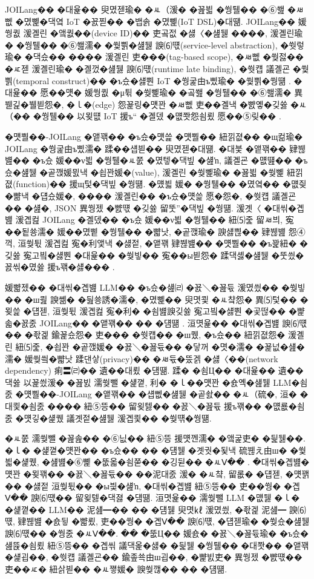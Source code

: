 \documentclass[10pt,twocolumn]{article}
\begin{document}
JOILang�� �대윭�� 臾몄젣瑜� �ㅻ（湲� �꾪븳 �쒕퉬�� �⑥쐞 �ㅽ뻾 �몄뼱�댁옄 IoT �꾨찓�� �뱁솕 �몄뼱(IoT DSL)�대떎. JOILang�� 媛쒕퀎 湲곌린 �앸퀎��(device ID)�� 吏곸젒 �섏〈�섎뒗 ����, 湲곌린瑜� �쒕퉬�� �⑥쐞濡� �쒗쁽�섎뒗 諛⑹떇(service-level abstraction), �쒓렇瑜� �댁슜�� ���� 湲곌린 吏���(tag-based scope), �ㅽ뻾 �쒖젏�� �ㅼ젣 湲곌린瑜� �곌껐�섎뒗 諛⑹떇(runtime late binding), �쒓컙 議곌굔 �쒗쁽(temporal construct)�� �ъ슜�섏뿬 IoT �쒕굹由ъ삤瑜� �쒗쁽�쒕떎 \cite{REF_JOILANG_PIPELINE}. �대윭�� 愿��먯� 媛쒕퀎 �μ튂 �쒖뼱瑜� �곸쐞 �쒕퉬�� �⑥쐞濡� 異붿긽�뷀븯怨�, �ｌ�(edge) 怨꾩링�먯꽌 �ㅽ뻾 吏��곌낵 �뺤옣�깆쓣 �ㅻ（�� �쒕퉬�� 以묒떖 IoT 援ъ“ �곌뎄 �먮쫫怨쇰룄 愿��⑤맂�� \cite{REF_EDGE_ARCH}.

�먯뿰��-JOILang �앹꽦�� �ъ슜�먯쓽 �먯뿰�� 紐낅졊�� �щ컮瑜� JOILang �쒕굹由ъ삤濡� 蹂��섑븯�� 臾몄젣�대떎. �대븣 �앹꽦�� 肄붾뱶�� �ъ슜 媛��ν븳 �쒕퉬�ㅻ쭔 �몄텧�댁빞 �섎ŉ, 議곌굔 �먮떒�� �ъ슜�섎뒗 �곹깭媛믨낵 �쇱꽌媛�(value), 湲곌린 �쒖뼱瑜� �꾪븳 �쒖뼱 紐낅졊(function)�� 援щ텇�댁빞 �쒕떎. �먰븳 媛� �쒕퉬�� �몄옄�� �먮즺�뺢낵 �덉슜媛�, ���� 湲곌린�� �ъ슜�먯쓽 愿�怨�, �쒓컙 議곌굔�� �섎�, JSON 異쒕젰 �뺤떇 �깆쓣 留뚯”�댁빞 �쒕떎. 湲곗〈 �대씪�곕뱶 湲곕컲 JOILang �곌뎄�� �ъ슜 媛��ν븳 �쒕퉬�� 紐⑸줉 留ㅽ븨, 寃��됱쑝濡� 媛��몄삩 �쒕퉬�� �뺣낫, �곹깭瑜� 諛섏쁺�� 肄붾뱶 怨④꺽, 洹쒖튃 湲곕컲 寃�利앷낵 �섏젙, �앹꽦 肄붾뱶�� �먯뿰�� �ъ꽕紐� �깆쓣 寃고빀�섏뿬 �대윭�� �쒖빟�� 寃��ы븯怨� 蹂댁셿�섎뒗 �뚯씠�꾨씪�몄쓣 援ъ꽦�섏��� \cite{REF_JOILANG_PIPELINE}.

媛뺣젰�� �대씪�곕뱶 LLM�� �ъ슜�섎㈃ �꾨＼�꾪듃 湲몄씠�� �쒖빟�� �ш쾶 諛쏆� �딆쑝誘�濡�, �몄뼱�� 臾몃쾿 �ㅻ챸怨� 異⑸텇�� �묒쓽 �덉젣, 洹쒖튃 湲곕컲 寃�利� �쇰뱶諛깆쓣 寃고빀�섏뿬 �곷떦�� �뺥솗�꾨줈 JOILang�� �앹꽦�� �� �덈떎 \cite{REF_JOILANG_PIPELINE}. 洹몃윭�� �대씪�곕뱶 諛⑹떇�� �좏겙 鍮꾩슜怨� 吏��� �쒓컙�� �ш퀬, �ъ슜�� 紐낅졊怨� 湲곌린 紐⑸줉, �쇱꽌 �곹깭媛� �꾨＼�꾪듃�� �닿꺼 �몃�濡� �꾩넚�섎�濡� 媛쒖씤�뺣낫 蹂댄샇(privacy)�� �ㅽ듃�뚰겕 �섏〈��(network dependency) 痢〓㈃�� 遺��대룄 �덈떎. 蹂� �쇰Ц�� �대윭�� 遺��댁쓣 以꾩씠湲� �꾪빐 濡쒖뺄 �섍꼍, 利� �ｌ��먯꽌 �숈옉�섎뒗 LLM�쇰줈 �먯뿰��-JOILang �앹꽦�� �섑뻾�섎뒗 �곹솴�� �ㅻ（硫�, 洹� �대쾿�쇰줈 ���� 紐⑤뜽�� 留욎텛�� �꾨＼�꾪듃 援ъ꽦�� �먮룞�쇰줈 �먯깋�섍퀬 議곗젙�섎뒗 湲곕쾿�� �쒖떆�쒕떎.

�ㅻ쭔 濡쒖뺄 �꾪솚�� �⑥닚�� 紐⑤뜽 援먯껜濡� �앸굹吏� �딅뒗��. �ｌ� �섍꼍�먯꽌�� �ъ슜�� �� �덈뒗 �곗궛�됯낵 硫붾え由ш� �쒗븳�섍퀬, �섎뱶�⑥뼱 �뚮옯�쇰쭏�� �깅뒫�� �ㅻⅤ�� \cite{REF_EDGE_GENAI_SURVEY,REF_EDGE_LLM_REVIEW}. �대씪�곕뱶�먯꽌 �묒꽦�� �꾨＼�꾪듃�� ��泥대줈 湲� �ㅻ챸, 留롮� �덉젣, �먯꽭�� �섏젙 洹쒖튃�� �ы븿�섎ŉ, �대씪�곕뱶 紐⑤뜽�� 吏��쒕� �곕Ⅴ�� 諛⑹떇�� 留욎텛�댁졇 �덈떎. 洹몃윭�� 濡쒖뺄 LLM �먮뒗 �ｌ� �섍꼍�� LLM�� 泥섎━�� �� �덈뒗 臾몃㎘ 湲몄씠, �좏겙 泥섎━ 諛⑹떇, 肄붾뱶 �숈뒿 �뺣룄, 吏��쒕� �곕Ⅴ�� 諛⑹떇, �덉젣瑜� �쒖슜�섎뒗 諛⑹떇�� �쒕줈 �ㅻⅤ��. �� �뚮Ц�� 媛숈� �꾨＼�꾪듃瑜� �ъ슜�섎뜑�쇰룄 紐⑤뜽�� �곕씪 議댁옱�섏� �딅뒗 �쒕퉬�� �대쫫�� �앹꽦�섍굅��, �쒓컙 議곌굔�� 鍮좊쑉由ш굅��, �뺥빐吏� 異쒕젰 �뺤떇�� 吏��ㅼ� 紐삵븯�� �ㅻ쪟媛� 諛쒖깮�� �� �덈떎.
\end{document}
